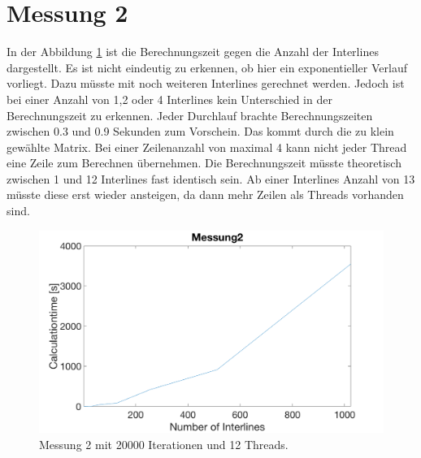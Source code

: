 \documentclass[11pt,a4paper]{article}
\begin{document}
\section{Messung 2}

In der Abbildung \ref{messung2} ist die Berechnungszeit gegen die Anzahl der Interlines dargestellt. Es ist nicht eindeutig zu erkennen, ob hier ein exponentieller Verlauf vorliegt. Dazu müsste mit noch weiteren Interlines gerechnet werden. Jedoch ist bei einer Anzahl von 1,2 oder 4 Interlines kein Unterschied in der Berechnungszeit zu erkennen. Jeder Durchlauf brachte Berechnungszeiten zwischen 0.3 und 0.9 Sekunden zum Vorschein. Das kommt durch die zu klein gewählte Matrix. Bei einer Zeilenanzahl von maximal 4 kann nicht jeder Thread eine Zeile zum Berechnen übernehmen. Die Berechnungszeit müsste theoretisch zwischen 1 und 12 Interlines fast identisch sein. Ab einer Interlines Anzahl von 13 müsste diese erst wieder ansteigen, da dann mehr Zeilen als Threads vorhanden sind. 

\begin{figure}[htb]
\centering
\includegraphics[width=1.0\textwidth,angle=0]{Messung2.png}
\caption{Messung 2 mit 20000 Iterationen und 12 Threads.}
\label{messung2}
\end{figure}
\end{document}
